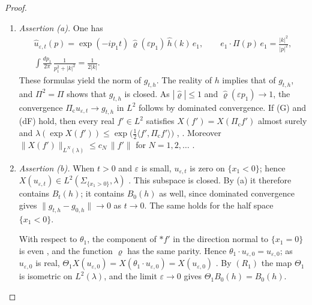 \documentclass[11pt]{amsart}
\theoremstyle{definition}
\begin{document}
\begin{proof}
\begin{enumerate}
\item[1.] \emph{Assertion (a).}
One has
\begin{gather*}
\hat u_{\varepsilon,t}(p)=\exp(-ip_1t)\,\hat\varrho(\varepsilon p_1)\,\hat h(k)\,e_1,\qquad
e_1\cdot\Pi(p)\,e_1=\frac{|k|^2}{|p|^2},\\
\int\frac{dp_1}{2\pi}\,\frac{1}{p_1^2+|k|^2}=\frac{1}{2|k|}.
\end{gather*}
These formulas yield the norm of $g_{t,h}$.
The reality of $h$ implies that of $g_{t,h}$, and $\Pi^2=\Pi$ shows that $g_{t,h}$ is closed.
As $|\hat\varrho|\le1$ and $\hat\varrho(\varepsilon p_1)\to1$, the convergence $\Pi_{\mathrm c}u_{\varepsilon,t}\to g_{t,h}$ in $L^2$ follows by dominated convergence.
If (G) and (dF) hold, then every real $f'\in L^2$ satisfies $X(f')=X(\Pi_{\mathrm c}f')$ almost surely and $\lambda(\exp X(f'))\le\exp\bigl(\frac12\langle f',\allowbreak \Pi_{\mathrm c}f'\rangle\bigr)$ \cite[Proposition~45.1\,(4), (11)]{QEDIII}, \cite[Remark~14.4]{QEDII}.
Moreover $\|X(f')\|_{L^N(\lambda)}\le c_N\,\|f'\|$ for $N=1,2,\dots$ \cite[Lemma~14.3\,(a)]{QEDII}.
\item[2.] \emph{Assertion (b).}
When $t>0$ and $\varepsilon$ is small, $u_{\varepsilon,t}$ is zero on $\{x_1<0\}$; hence $X(u_{\varepsilon,t})\in L^2(\Sigma_{\{x_1>0\}},\lambda)$ \cite[Lemma~14.3\,(a)]{QEDII}.
This subspace is closed.
By (a) it therefore contains $B_t(h)$; it contains $B_0(h)$ as well, since dominated convergence gives $\|g_{t,h}-g_{0,h}\|\to0$ as $t\to0$.
The same holds for the half space $\{x_1<0\}$.

With respect to $\theta_1$, the component of $\ast f'$ in the direction normal to $\{x_1=0\}$ is even \cite[Section~14.1, after Definition~14.1]{QEDII}, and the function $\varrho$ has the same parity.
Hence $\theta_1\cdot u_{\varepsilon,0}=u_{\varepsilon,0}$; as $u_{\varepsilon,0}$ is real, $\Theta_1X(u_{\varepsilon,0})=\allowbreak X(\theta_1\cdot u_{\varepsilon,0})=\allowbreak X(u_{\varepsilon,0})$ \cite[Section~14.1, after Definition~14.1]{QEDII}.
By $(R_1)$ the map $\Theta_1$ is isometric on $L^2(\lambda)$, and the limit $\varepsilon\to0$ gives $\Theta_1B_0(h)=B_0(h)$.


\end{enumerate}
\end{proof}
\end{document}
